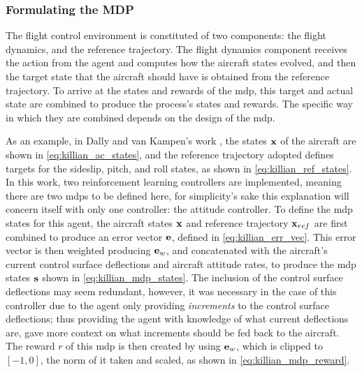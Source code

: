 \documentclass[../report.tex]{subfiles}
\begin{document}
\subsubsection{Formulating the MDP}

The flight control environment is constituted of two components: the flight dynamics, and the reference trajectory. The flight dynamics component receives the action from the agent and computes how the aircraft states evolved, and then the target state that the aircraft should have is obtained from the reference trajectory. To arrive at the states and rewards of the \ac{mdp}, this target and actual state are combined to produce the process's states and rewards. The specific way in which they are combined depends on the design of the \ac{mdp}. 

As an example, in Dally and van Kampen's work \cite{killian}, the states $\bold{x}$ of the aircraft are shown in \autoref{eq:killian_ac_states}, and the reference trajectory adopted defines targets for the sideslip, pitch, and roll states, as shown in \autoref{eq:killian_ref_states}. In this work, two reinforcement learning controllers are implemented, meaning there are two \ac{mdp}s to be defined here, for simplicity's sake this explanation will concern itself with only one controller: the attitude controller. To define the \ac{mdp} states for this agent, the aircraft states $\bold{x}$ and reference trajectory $\bold{x}_{ref}$ are first combined to produce an error vector $\bold{e}$, defined in \autoref{eq:killian_err_vec}. This error vector is then weighted producing $\bold{e}_w$, and concatenated with the aircraft's current control surface deflections and aircraft attitude rates, to produce the \ac{mdp} states $\bold{s}$ shown in \autoref{eq:killian_mdp_states}. The inclusion of the control surface deflections may seem redundant, however, it was necessary in the case of this controller due to the agent only providing \textit{increments} to the control surface deflections; thus providing the agent with knowledge of what current deflections are, gave more context on what increments should be fed back to the aircraft. The reward $r$ of this \ac{mdp} is then created by using $\bold{e}_w$, which is clipped to $[-1, 0]$, the norm of it taken and scaled, as shown in \autoref{eq:killian_mdp_reward}.
\end{document}
